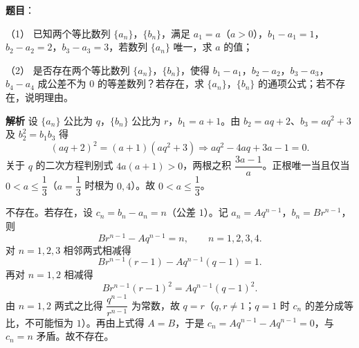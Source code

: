 \begin{answer}

\textbf{题目}：

（1） 已知两个等比数列 $\{a_n\}$，$\{b_n\}$，满足 $a_1=a$（$a>0$），$b_1-a_1=1$，$b_2-a_2=2$，$b_3-a_3=3$，若数列 $\{a_n\}$ 唯一，求 $a$ 的值；

（2） 是否存在两个等比数列 $\{a_n\}$，$\{b_n\}$，使得 $b_1-a_1$，$b_2-a_2$，$b_3-a_3$，$b_4-a_4$ 成公差不为 $0$ 的等差数列？若存在，求 $\{a_n\}$，$\{b_n\}$ 的通项公式；若不存在，说明理由。

\textbf{解析}
设 $\{a_n\}$ 公比为 $q$，$\{b_n\}$ 公比为 $r$，$b_1=a+1$。由 $b_2=aq+2$、$b_3=aq^2+3$ 及 $b_2^2=b_1b_3$ 得
\nopagebreak[4]
\[(aq+2)^2=(a+1)(aq^2+3)\Longrightarrow aq^2-4aq+3a-1=0.\]
关于 $q$ 的二次方程判别式 $4a(a+1)>0$，两根之积 $\dfrac{3a-1}a$。正根唯一当且仅当 $0<a\leqslant\dfrac13$（$a=\dfrac13$ 时根为 $0,4$）。故 $0<a\leqslant\dfrac13$。

不存在。若存在，设 $c_n=b_n-a_n=n$（公差 $1$）。记 $a_n=Aq^{n-1}$，$b_n=Br^{n-1}$，则
\nopagebreak[4]
\[Br^{n-1}-Aq^{n-1}=n,\qquad n=1,2,3,4.\]
对 $n=1,2,3$ 相邻两式相减得
\nopagebreak[4]
\[Br^{n-1}(r-1)-Aq^{n-1}(q-1)=1.\]
再对 $n=1,2$ 相减得
\nopagebreak[4]
\[Br^{n-1}(r-1)^2=Aq^{n-1}(q-1)^2.\]
由 $n=1,2$ 两式之比得 $\dfrac{q^{n-1}}{r^{n-1}}$ 为常数，故 $q=r$（$q,r\neq1$；$q=1$ 时 $c_n$ 的差分成等比，不可能恒为 $1$）。再由上式得 $A=B$，于是 $c_n=Aq^{n-1}-Aq^{n-1}=0$，与 $c_n=n$ 矛盾。故不存在。



\end{answer}